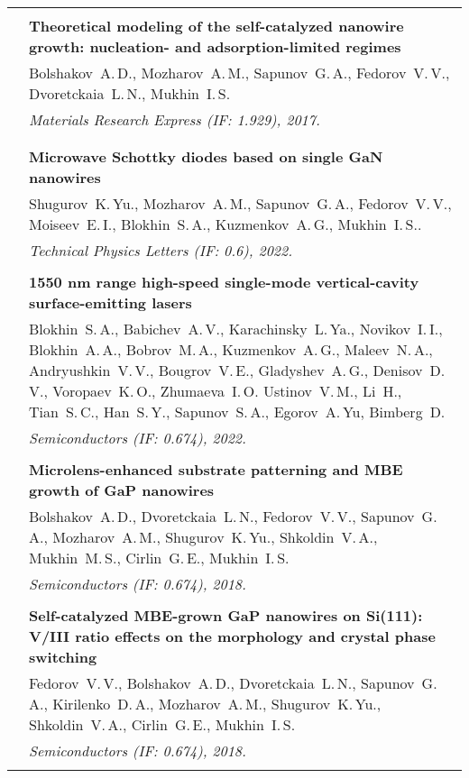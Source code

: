 \documentclass[letterpaper, 11pt]{article}
\begin{document}
\begin{longtable}{p{1.3in}p{4.8in}}
		\nohyphens{\color{OliveGreen}{Q2 Publications}} \\
        & \textbf{Theoretical modeling of the self-catalyzed nanowire growth:
        nucleation- and adsorption-limited regimes} \\
        & Bolshakov~A.\,D., Mozharov~A.\,M., Sapunov~G.\,A., Fedorov~V.\,V.,
        Dvoretckaia~L.\,N., Mukhin~I.\,S. \\
        & \textit{Materials Research Express (IF: 1.929), 2017.}\\
		& \\

		\nohyphens{\color{OliveGreen}{Q3 Publications}} \\
        & \textbf{Microwave Schottky diodes based on single GaN nanowires} \\
        & Shugurov~K.\,Yu., Mozharov~A.\,M., Sapunov~G.\,A., Fedorov~V.\,V.,
        Moiseev~E.\,I., Blokhin~S.\,A., Kuzmenkov~A.\,G., Mukhin~I.\,S.. \\
		& \textit{Technical Physics Letters (IF: 0.6), 2022.}\\
		& \\

        & \textbf{1550 nm range high-speed single-mode vertical-cavity
        surface-emitting lasers} \\
        & Blokhin~S.\,A., Babichev~A.\,V., Karachinsky~L.\,Ya., Novikov~I.\,I.,
        Blokhin~A.\,A., Bobrov~M.\,A., Kuzmenkov~A.\,G., Maleev~N.\,A.,
        Andryushkin~V.\,V., Bougrov~V.\,E., Gladyshev~A.\,G., Denisov~D.\,V.,
        Voropaev~K.\,O., Zhumaeva~I.\,O. Ustinov~V.\,M., Li~H., Tian~S.\,C.,
        Han~S.\,Y., Sapunov~S.\,A., Egorov~A.\,Yu, Bimberg~D. \\
		& \textit{Semiconductors (IF: 0.674), 2022.}\\
		& \\

        & \textbf{Microlens-enhanced substrate patterning and MBE growth of GaP
        nanowires} \\
        & Bolshakov~A.\,D., Dvoretckaia~L.\,N., Fedorov~V.\,V., Sapunov~G.\,A.,
        Mozharov~A.\,M., Shugurov~K.\,Yu., Shkoldin~V.\,A., Mukhin~M.\,S.,
        Cirlin~G.\,E., Mukhin~I.\,S. \\
		& \textit{Semiconductors (IF: 0.674), 2018.}\\
		& \\

        & \textbf{Self-catalyzed MBE-grown GaP nanowires on Si(111): V/III
        ratio effects on the morphology and crystal phase switching} \\
        & Fedorov~V.\,V., Bolshakov~A.\,D., Dvoretckaia~L.\,N., Sapunov~G.\,A.,
        Kirilenko~D.\,A., Mozharov~A.\,M., Shugurov~K.\,Yu., Shkoldin~V.\,A.,
        Cirlin~G.\,E., Mukhin~I.\,S. \\
		& \textit{Semiconductors (IF: 0.674), 2018.}\\
		& \\
		

\end{longtable}
\end{document}
